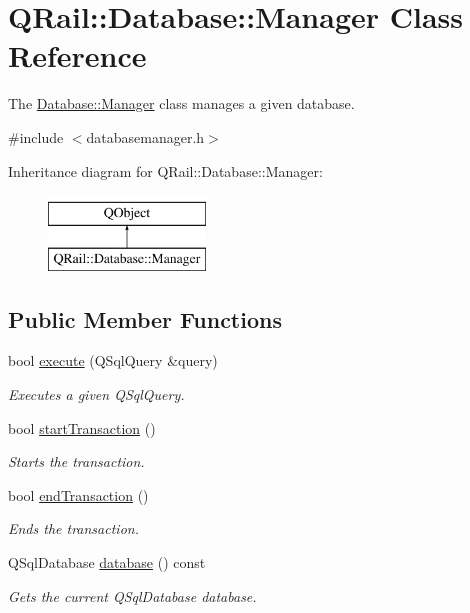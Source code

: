\hypertarget{classQRail_1_1Database_1_1Manager}{}\section{Q\+Rail\+::Database\+::Manager Class Reference}
\label{classQRail_1_1Database_1_1Manager}


The \mbox{\hyperlink{classQRail_1_1Database_1_1Manager}{Database\+::\+Manager}} class manages a given database.  




{\ttfamily \#include $<$databasemanager.\+h$>$}

Inheritance diagram for Q\+Rail\+::Database\+::Manager\+:\begin{figure}[H]
\begin{center}
\leavevmode
\includegraphics[height=2.000000cm]{classQRail_1_1Database_1_1Manager}
\end{center}
\end{figure}
\subsection*{Public Member Functions}
\begin{DoxyCompactItemize}
\item 
bool \mbox{\hyperlink{classQRail_1_1Database_1_1Manager_a80bd96eaa935d721bf0fbec1de6d0862}{execute}} (Q\+Sql\+Query \&query)
\begin{DoxyCompactList}\small\item\em Executes a given Q\+Sql\+Query. \end{DoxyCompactList}\item 
bool \mbox{\hyperlink{classQRail_1_1Database_1_1Manager_a57d22c2b445cec8bbd43bf47fa2dd257}{start\+Transaction}} ()
\begin{DoxyCompactList}\small\item\em Starts the transaction. \end{DoxyCompactList}\item 
bool \mbox{\hyperlink{classQRail_1_1Database_1_1Manager_a027f3ec1350204386c5328ec8628b276}{end\+Transaction}} ()
\begin{DoxyCompactList}\small\item\em Ends the transaction. \end{DoxyCompactList}\item 
Q\+Sql\+Database \mbox{\hyperlink{classQRail_1_1Database_1_1Manager_a68d971d9a7e9a6e41d2ab06892711288}{database}} () const
\begin{DoxyCompactList}\small\item\em Gets the current Q\+Sql\+Database database. \end{DoxyCompactList}\end{DoxyCompactItemize}
